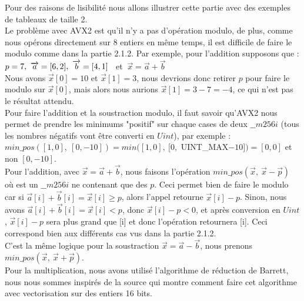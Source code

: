 \documentclass[12pt, a4paper]{article}
\begin{document}
Pour des raisons de lisibilité nous allons illustrer cette partie avec des exemples de tableaux de taille 2. \\
\indent Le problème avec AVX2 est qu'il n'y a pas d'opération modulo, de plus, comme nous opérons directement sur 8 entiers en même temps, il est difficile de faire le modulo comme dans la partie 2.1.2.
Par exemple, pour l'addition supposons que : \\
\indent \indent $p = 7, \ \overrightarrow{a} = [6, 2], \ \space \overrightarrow{b} = [4, 1]$ \ et $ \ \overrightarrow{x} = \overrightarrow{a}+\overrightarrow{b}$ \\
Nous avons $\overrightarrow{x}[0] = 10$ et $\overrightarrow{x}[1] = 3$, nous devrions donc retirer $p$ pour faire le modulo sur $\overrightarrow{x}[0]$, mais alors nous aurions $\overrightarrow{x}[1] = 3-7 = -4$, ce qui n'est pas le résultat attendu.\\ 
\indent Pour faire l'addition et la soustraction modulo, il faut savoir qu'AVX2 nous permet de prendre les minimums "positif" sur chaque cases de deux $\_\_m256i$ (tous les nombres négatifs vont être converti en $Uint$), par exemple :\\ $min\_pos([1, 0],\  [0, -10]) = min([1, 0], \ [0,$ UINT\_MAX$-10]) = [0, 0]$ et non $[0, -10]$. \\
\indent Pour l'addition, avec $\overrightarrow{x} = \overrightarrow{a}+\overrightarrow{b}$, nous faisons l'opération $min\_pos(\overrightarrow{x},\ \overrightarrow{x}-\overrightarrow{p})$ où  est un $\_\_m256i$ ne contenant que des $p$. Ceci permet bien de faire le modulo car si $\overrightarrow{a}[i] + \overrightarrow{b}[i] = \overrightarrow{x}[i] \geq p$, alors l'appel retourne $\overrightarrow{x}[i] - p$. Sinon, nous avons $\overrightarrow{a}[i] + \overrightarrow{b}[i] = \overrightarrow{x}[i] < p$, donc $\overrightarrow{x}[i]-p < 0$, et après conversion en $Uint$, $\overrightarrow{x}[i]-p$ sera plus grand que [i] et donc l'opération retournera [i]. Ceci correspond bien aux différents cas vus dans la partie 2.1.2. \\
C'est la même logique pour la soustraction $\overrightarrow{x} = \overrightarrow{a}-\overrightarrow{b}$, nous prenons $min\_pos(\overrightarrow{x},\ \overrightarrow{x}+\overrightarrow{p})$. \\
\indent Pour la multiplication, nous avons utilisé l'algorithme de réduction de Barrett, nous nous sommes inspirés de la source \cite{SIMD} qui montre comment faire cet algorithme avec vectorisation sur des entiers 16 bits.
\end{document}
